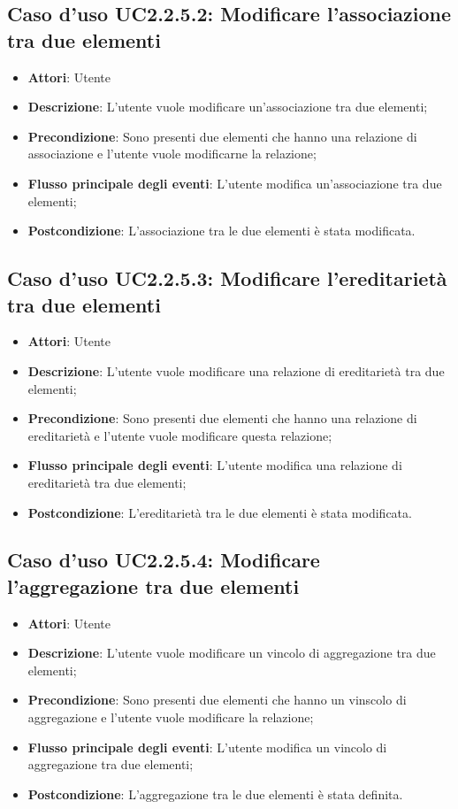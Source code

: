 \documentclass[../AnalisiDeiRequisiti.tex]{subfiles}
\begin{document}
			\subsection{Caso d'uso UC2.2.5.2: Modificare l'associazione tra due elementi}
			\begin{itemize}
				\item \textbf{Attori}: Utente
				\item \textbf{Descrizione}: L'utente vuole modificare un'associazione tra due elementi;
				\item \textbf{Precondizione}: Sono presenti due elementi che hanno una relazione di associazione e l'utente vuole modificarne la relazione;
				\item \textbf{Flusso principale degli eventi}: L'utente modifica un'associazione tra due elementi;
				\item \textbf{Postcondizione}: L'associazione tra le due elementi è stata modificata.
			\end{itemize}
			\subsection{Caso d'uso UC2.2.5.3: Modificare l'ereditarietà tra due elementi}
			\begin{itemize}
				\item \textbf{Attori}: Utente
				\item \textbf{Descrizione}: L'utente vuole modificare una relazione di ereditarietà tra due elementi;
				\item \textbf{Precondizione}: Sono presenti due elementi che hanno una relazione di ereditarietà e l'utente vuole modificare questa relazione;
				\item \textbf{Flusso principale degli eventi}: L'utente modifica una relazione di ereditarietà tra due elementi;
				\item \textbf{Postcondizione}: L'ereditarietà tra le due elementi è stata modificata.
			\end{itemize}
			\subsection{Caso d'uso UC2.2.5.4: Modificare l'aggregazione tra due elementi}
			\begin{itemize}
				\item \textbf{Attori}: Utente
				\item \textbf{Descrizione}: L'utente vuole modificare un vincolo di aggregazione tra due elementi;
				\item \textbf{Precondizione}: Sono presenti due elementi che hanno un vinscolo di aggregazione e l'utente vuole modificare la relazione;
				\item \textbf{Flusso principale degli eventi}: L'utente modifica un vincolo di aggregazione tra due elementi;
				\item \textbf{Postcondizione}: L'aggregazione tra le due elementi è stata definita.
			\end{itemize}
\end{document}
